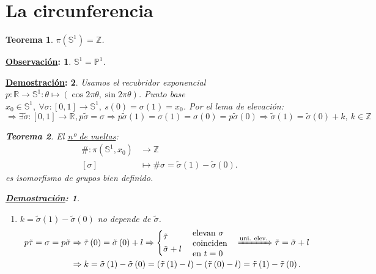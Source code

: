 \documentclass[10pt,a4paper,openright]{book}
\theoremstyle{break}
\newtheorem*{theo}{Teorema}
\newtheorem*{demo}{\underline{Demostración}:}
\newtheorem*{obs}{\underline{Observación}:}
\begin{document}
\section{La circunferencia}%
\label{sec:la_circunferencia}
\begin{theo}
$\pi\left( \mathbb{S}^{1} \right) = \mathbb{Z}$.
\end{theo}
\begin{obs}
$\mathbb{S}^{1} = \mathbb{P}^{1}$.
\end{obs}
\begin{demo}
    Usamos el recubridor exponencial $p: \mathbb{R} \rightarrow \mathbb{S}^{1}: \theta \mapsto \left( \cos 2 \pi \theta, \sin 2 \pi \theta \right)$. Punto base $x_0 \in \mathbb{S}^{1},\ \forall \sigma: \left[ 0, 1 \right] \rightarrow \mathbb{S}^{1},\ s\left( 0 \right) = \sigma\left( 1 \right) = x_0$. Por el lema de elevación:
    \[
    \Rightarrow \exists \tilde{\sigma} : \left[ 0, 1 \right] \rightarrow \mathbb{R}^{}, p \tilde{\sigma} = \sigma \Rightarrow p \tilde{\sigma} \left( 1 \right) = \sigma\left( 1 \right) = \sigma\left( 0 \right) = p \tilde{\sigma} \left( 0 \right) \Rightarrow \tilde{\sigma} \left( 1 \right) = \tilde{\sigma} \left( 0 \right) + k,\ k \in \mathbb{Z}
    \]

\begin{theo}
    El \underline{nº de vueltas}:
    \begin{align*}
        \#: \pi\left( \mathbb{S}^{1}, x_0 \right) &\rightarrow \mathbb{Z}\\
        \left[ \sigma \right] &\mapsto \# \sigma = \tilde{\sigma}\left( 1 \right) - \tilde{\sigma}\left( 0 \right) 
    .\end{align*}
    es isomorfismo de grupos bien definido.
\end{theo}
\begin{demo}
    \begin{enumerate}
        \item $k = \tilde{\sigma} \left( 1 \right) - \tilde{\sigma} \left( 0 \right)$ no depende de $\tilde{\sigma}$. 
        \begin{align*}
            p \tilde{\tau} = \sigma = p \tilde{\sigma} &\Rightarrow \tilde{\tau} \left( 0 \right) = \tilde{\sigma} \left( 0 \right) + l \Rightarrow \begin{cases}
                \tilde{\tau}\\
                \tilde{\sigma} + l
            \end{cases} \parbox{5em}{elevan $\sigma$\\ coinciden\\ en $t = 0$} \xRightarrow{\text{uni. elev.}} \tilde{\tau} = \tilde{\sigma} + l\\
            &\Rightarrow k = \tilde{\sigma}\left( 1 \right) - \tilde{\sigma} \left( 0 \right) = \left( \tilde{\tau} \left( 1 \right) - l \right) - \left( \tilde{\tau} \left( 0 \right) - l \right) = \tilde{\tau} \left( 1 \right) - \tilde{\tau} \left( 0 \right) 
        .\end{align*}


\end{enumerate}
\end{demo}
\end{demo}
\end{document}
